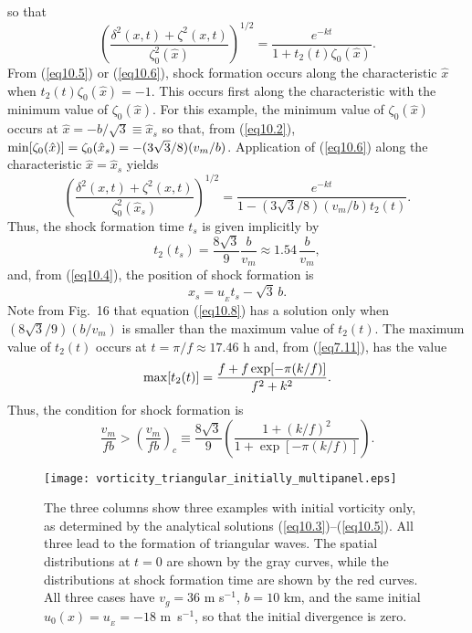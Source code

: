 \documentclass[10pt]{article}
\begin{document}
so that
\begin{equation}                                    %
        \left(\frac{\delta^2(x,t) + \zeta^2(x,t)}{\zeta_0^2(\hat{x})}\right)^{1/2}
     = \frac{e^{-kt}}{1 + t_2(t)\zeta_0(\hat{x})}.
\label{eq10.6}
\end{equation}
From (\ref{eq10.5}) or (\ref{eq10.6}), shock formation occurs along the characteristic
$\hat{x}$ when $t_2(t)\zeta_0(\hat{x}) = -1$. This occurs first along the characteristic
with the minimum value of $\zeta_0(\hat{x})$. For this example, the minimum value of
$\zeta_0(\hat{x})$ occurs at $\hat{x}=-b/\sqrt{3}\equiv\hat{x}_s$ so that, from (\ref{eq10.2}),
${\rm min}[\zeta_0(\hat{x})]=\zeta_0(\hat{x}_s) = -(3\sqrt{3}/8)(v_m/b)$. Application
of (\ref{eq10.6}) along the characteristic $\hat{x}=\hat{x}_s$ yields
\begin{equation}                                    %
        \left(\frac{\delta^2(x,t) + \zeta^2(x,t)}{\zeta_0^2(\hat{x}_s)}\right)^{1/2}
     = \frac{e^{-kt}}{1 - (3\sqrt{3}/8)(v_m/b)t_2(t)}.
\label{eq10.7}
\end{equation}
Thus, the shock formation time $t_s$ is given implicitly by
\begin{equation}                                  %
         t_2(t_s) = \frac{8\sqrt{3}}{9}\frac{b}{v_m} \approx 1.54\,\frac{b}{v_m},
\label{eq10.8}
\end{equation}
and, from (\ref{eq10.4}), the position of shock formation is
\begin{equation}                                  %
             x_s = u_{_E} t_s - \sqrt{3}\, b.
\label{eq10.9}
\end{equation}
Note from Fig.~16 that equation (\ref{eq10.8}) has a solution only when $(8\sqrt{3}/9)(b/v_m)$
is smaller than the maximum value of $t_2(t)$. The maximum value of $t_2(t)$
occurs at $t=\pi/f \approx 17.46$ h and, from (\ref{eq7.11}), has the value
   $$  {\rm max}[t_2(t)] = \frac{f+f\exp[-\pi(k/f)]}{f^2+k^2}.  $$
Thus, the condition for shock formation is
\begin{equation}                                  %
         \frac{v_m}{fb} > \left(\frac{v_m}{fb}\right)_c
       \equiv \frac{8\sqrt{3}}{9}\left(\frac{1 + (k/f)^2}{1 + \exp[-\pi(k/f)]}\right).
\label{eq10.10}
\end{equation}
\begin{figure*}[t]                   %
\centerline{\texttt{[image: vorticity\_triangular\_initially\_multipanel.eps]}}
\caption{The three columns show three examples with initial vorticity only,
as determined by the analytical solutions (\ref{eq10.3})--(\ref{eq10.5}). All three
lead to the formation of triangular waves. The spatial distributions
at $t=0$ are shown by the gray curves, while the distributions
at shock formation time are shown by the red curves. All three cases have
$v_g=36$ m s$^{-1}$, $b=10$ km, and the same initial $u_0(x)=u_{_E}=-18$ m~s$^{-1}$,
so that the initial divergence is zero.}
\end{figure*}
\end{document}
